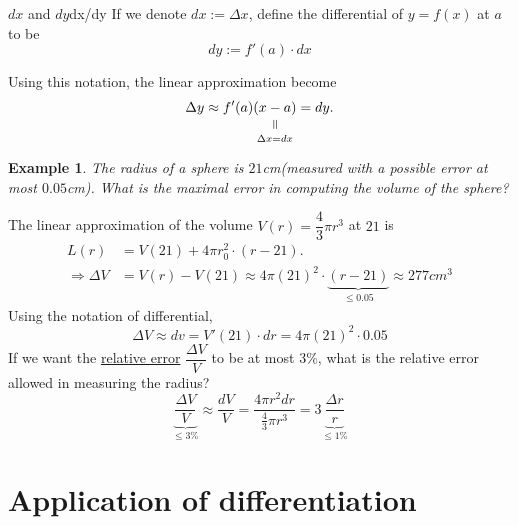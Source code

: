 \documentclass[12pt,a4paper]{article}
\newcommand{\verteq}{\rotatebox{90}{$\,=$}}
\newcommand{\equalto}[2]{\underset{\scriptstyle\overset{\mkern4mu\verteq}{#2}}{#1}}
\theoremstyle{mystyle}
\numberwithin{figure}{subsection}
\newtheorem{exm}{Example}[subsection] %
\newenvironment{ex}{\begin{exBox}\begin{exm}}{\end{exm}\end{exBox}}
\begin{document}
\begin{df}{$dx$ and $dy$}{dx/dy}
    If we denote $dx := \Delta x$, define the differential of $y=f(x)$ at $a$ to be \[dy := f'(a) \cdot dx\]
\end{df}
Using this notation, the linear approximation become
\[
\Delta y \approx f'(a)\equalto{(x-a)}{\Delta x = dx}=dy.
\]
\begin{ex}
    The radius of a sphere is $21$cm(measured with a possible error at most $0.05$cm). What is the maximal error in computing the volume of the sphere?
\end{ex}
The linear approximation of the volume $V(r) = \dfrac{4}{3}\pi r^3$ at $21$ is
\begin{align*}
L(r)&=V(21)+4\pi r_0^2 \cdot (r-21). \\
\Rightarrow \Delta V &= V(r)-V(21) \approx 4\pi(21)^2 \cdot \underbrace{(r-21)}_{\le 0.05} \approx 277 cm^3
\end{align*}
Using the notation of differential,
\[
\Delta V \approx dv = V'(21) \cdot dr= 4\pi (21)^2 \cdot 0.05
\]
If we want the \underline{relative error} $\dfrac{\Delta V}{V}$ to be at most $3\%$, what is the relative error allowed in measuring the radius?
\[
\underbrace{\dfrac{\Delta V}{V}}_{\le 3\%} \approx \frac{dV}{V} = \frac{4\pi r^2 dr}{\frac{4}{3}\pi r^3}=3\underbrace{\frac{\Delta r}{r}}_{\le 1\%}
\]
\section{Application of differentiation}
\end{document}
